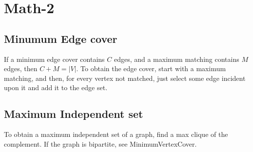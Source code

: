 \section{Math-2}
	\subsection{Minumum Edge cover}
  If a minimum edge cover contains $C$ edges, and a maximum matching contains $M$ edges, then $C+M = |V|$. To obtain
  the edge cover, start with a maximum matching, and then, for every vertex not matched, just select some edge
  incident upon it and add it to the edge set.

	\subsection{Maximum Independent set}
  To obtain a maximum independent set of a graph, find a max
  clique of the complement. If the graph is bipartite, see MinimumVertexCover.

